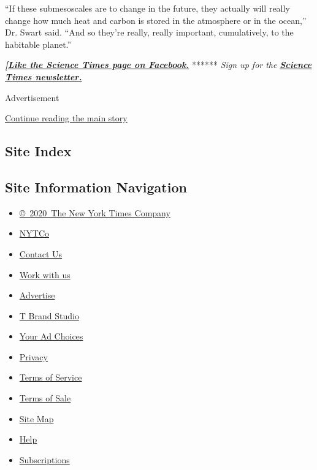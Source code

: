 ``If these submesoscales are to change in the future, they actually will
really change how much heat and carbon is stored in the atmosphere or in
the ocean,'' Dr. Swart said. ``And so they're really, really important,
cumulatively, to the habitable planet.''

\textbf{\emph{{[}}\href{http://on.fb.me/1paTQ1h}{\emph{Like the Science
Times page on Facebook.}}} ****** \emph{\textbar{} Sign up for the}
\textbf{\href{http://nyti.ms/1MbHaRU}{\emph{Science Times newsletter.}}}

Advertisement

\protect\hyperlink{after-bottom}{Continue reading the main story}

\hypertarget{site-index}{%
\subsection{Site Index}\label{site-index}}

\hypertarget{site-information-navigation}{%
\subsection{Site Information
Navigation}\label{site-information-navigation}}

\begin{itemize}
\tightlist
\item
  \href{https://help.nytimes3xbfgragh.onion/hc/en-us/articles/115014792127-Copyright-notice}{©~2020~The
  New York Times Company}
\end{itemize}

\begin{itemize}
\tightlist
\item
  \href{https://www.nytco.com/}{NYTCo}
\item
  \href{https://help.nytimes3xbfgragh.onion/hc/en-us/articles/115015385887-Contact-Us}{Contact
  Us}
\item
  \href{https://www.nytco.com/careers/}{Work with us}
\item
  \href{https://nytmediakit.com/}{Advertise}
\item
  \href{http://www.tbrandstudio.com/}{T Brand Studio}
\item
  \href{https://www.nytimes3xbfgragh.onion/privacy/cookie-policy\#how-do-i-manage-trackers}{Your
  Ad Choices}
\item
  \href{https://www.nytimes3xbfgragh.onion/privacy}{Privacy}
\item
  \href{https://help.nytimes3xbfgragh.onion/hc/en-us/articles/115014893428-Terms-of-service}{Terms
  of Service}
\item
  \href{https://help.nytimes3xbfgragh.onion/hc/en-us/articles/115014893968-Terms-of-sale}{Terms
  of Sale}
\item
  \href{https://spiderbites.nytimes3xbfgragh.onion}{Site Map}
\item
  \href{https://help.nytimes3xbfgragh.onion/hc/en-us}{Help}
\item
  \href{https://www.nytimes3xbfgragh.onion/subscription?campaignId=37WXW}{Subscriptions}
\end{itemize}
